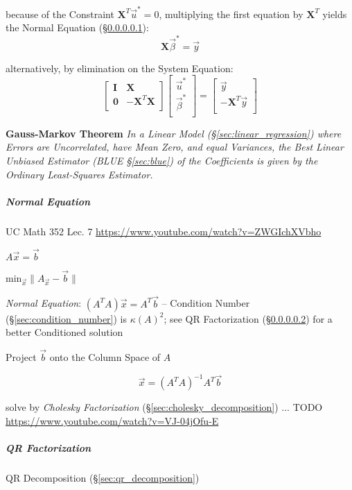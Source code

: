 because of the Constraint $\mathbf{X}^T \vec{u}^* = 0$, multiplying the first
equation by $\mathbf{X}^T$ yields the Normal Equation
(\S\ref{sec:normal_equation}):
\[
  \mathbf{X}\vec{\beta}^* = \vec{y}
\]

alternatively, by elimination on the System Equation:
\[
  \begin{bmatrix}
    \mathbf{I} & \mathbf{X} \\
    \mathbf{0} & -\mathbf{X}^T\mathbf{X} \\
  \end{bmatrix} \begin{bmatrix}
    \vec{u}^*     \\
    \vec{\beta}^* \\
  \end{bmatrix} = \begin{bmatrix}
    \vec{y} \\
    -\mathbf{X}^T \vec{y} \\
  \end{bmatrix}
\]

\textbf{Gauss-Markov Theorem} \emph{
  In a Linear Model (\S\ref{sec:linear_regression}) where Errors are
  Uncorrelated, have Mean Zero, and equal Variances, the Best Linear Unbiased
  Estimator (BLUE \S\ref{sec:blue}) of the Coefficients is given by the Ordinary
  Least-Squares Estimator.
}



\subparagraph{Normal Equation}\label{sec:normal_equation}\hfill

UC Math 352 Lec. 7 \url{https://www.youtube.com/watch?v=ZWGIchXVbho}

$A\vec{x} = \vec{b}$

$\mathrm{min}_{\vec{x}} \|A_{\vec{x}} - \vec{b}\|$

\emph{Normal Equation}: $(A^TA)\vec{x} = A^T\vec{b}$ -- Condition Number
(\S\ref{sec:condition_number}) is $\kappa(A)^2$; see QR Factorization
(\S\ref{sec:qr_factorization}) for a better Conditioned solution

Project $\vec{b}$ onto the Column Space of $A$

\[
  \vec{x} = (A^TA)^{-1}A^T\vec{b}
\]

solve by \emph{Cholesky Factorization} (\S\ref{sec:cholesky_decomposition}) ...
TODO \url{https://www.youtube.com/watch?v=VJ-04jOfu-E}



\subparagraph{QR Factorization}\label{sec:qr_factorization}\hfill

QR Decomposition (\S\ref{sec:qr_decomposition})


